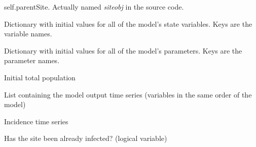 \documentclass[a4paper,10pt,english]{sphinxmanual}
\begin{document}
\begin{fulllineitems}
\label{scripting:Site}
self.parentSite. Actually named \emph{siteobj} in the source code.

\begin{fulllineitems}
\label{scripting:Site.bi}
Dictionary with initial values for all of the model's state variables. Keys are the variable names.

\end{fulllineitems}


\begin{fulllineitems}
\label{scripting:Site.bp}
Dictionary with initial values for all of the model's parameters. Keys are the parameter names.

\end{fulllineitems}


\begin{fulllineitems}
\label{scripting:Site.totpop}
Initial total population

\end{fulllineitems}


\begin{fulllineitems}
\label{scripting:Site.ts}
List containing the model output time series (variables in the same order of the model)

\end{fulllineitems}


\begin{fulllineitems}
\label{scripting:Site.incidence}
Incidence time series

\end{fulllineitems}


\begin{fulllineitems}
\label{scripting:Site.infected}
Has the site been already infected? (logical variable)

\end{fulllineitems}


\end{fulllineitems}
\end{document}
